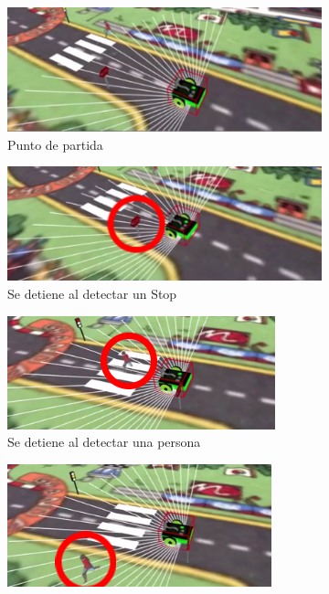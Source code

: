 \documentclass{report}
\begin{document}
\begin{figure}[h]
\begin{subfigure}{.5\textwidth}
  \centering
  \includegraphics[width=.7\linewidth]{images/cap4/1-1.png}  
  \caption{Punto de partida}
  \label{fig:sub-first}
\end{subfigure}
\begin{subfigure}{.5\textwidth}
  \centering
  \includegraphics[width=.7\linewidth]{images/cap4/2-1.png}  
  \caption{Se detiene al detectar un Stop}
  \label{fig:sub-second}
\end{subfigure}
\begin{subfigure}{.5\textwidth}
  \centering
  \includegraphics[width=.7\linewidth]{images/cap4/3-1.png}  
  \caption{Se detiene al detectar una persona}
  \label{fig:sub-third}
\end{subfigure}
\begin{subfigure}{.5\textwidth}
  \centering
  \includegraphics[width=.7\linewidth]{images/cap4/4-1.png}  

\end{subfigure}
\end{figure}
\end{document}
